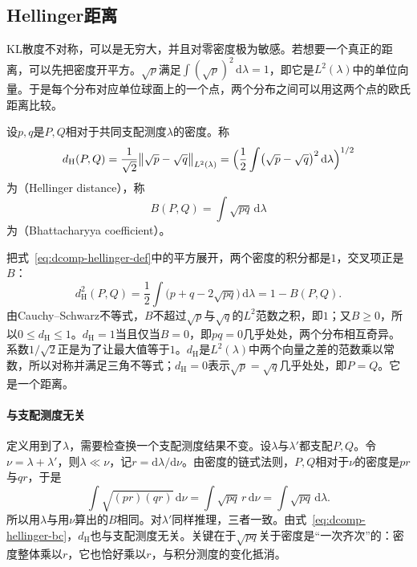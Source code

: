 \subsection{Hellinger距离}
\label{sec:dcomp-hellinger}

KL散度不对称，可以是无穷大，并且对零密度极为敏感。若想要一个真正的距离，可以先把密度开平方。$\sqrt{p}$满足$\int(\sqrt{p})^{2}\,\mathrm{d}\lambda=1$，即它是$L^{2}(\lambda)$中的单位向量。于是每个分布对应单位球面上的一个点，两个分布之间可以用这两个点的欧氏距离比较。

\begin{definition}[Hellinger距离与Bhattacharyya系数]
\label{def:dcomp-hellinger}
设$p,q$是$P,Q$相对于共同支配测度$\lambda$的密度。称
\begin{equation}
 d_{\mathrm{H}}(P,Q)=\frac{1}{\sqrt2}\bigl\lVert\sqrt{p}-\sqrt{q}\bigr\rVert_{L^{2}(\lambda)}=\Bigl(\frac12\int\bigl(\sqrt{p}-\sqrt{q}\bigr)^{2}\,\mathrm{d}\lambda\Bigr)^{1/2}
 \label{eq:dcomp-hellinger-def}
\end{equation}
为（Hellinger distance），称
\begin{equation}
 B(P,Q)=\int\sqrt{pq}\,\mathrm{d}\lambda
 \label{eq:dcomp-bhattacharyya-coefficient}
\end{equation}
为（Bhattacharyya coefficient）。
\end{definition}

把式~\eqref{eq:dcomp-hellinger-def}中的平方展开，两个密度的积分都是$1$，交叉项正是$B$：
\begin{equation}
 d_{\mathrm{H}}^{2}(P,Q)=\frac12\int\bigl(p+q-2\sqrt{pq}\bigr)\,\mathrm{d}\lambda=1-B(P,Q) .
 \label{eq:dcomp-hellinger-bc}
\end{equation}
由Cauchy--Schwarz不等式，$B$不超过$\sqrt{p}$与$\sqrt{q}$的$L^{2}$范数之积，即$1$；又$B\geq0$，所以$0\leq d_{\mathrm{H}}\leq1$。$d_{\mathrm{H}}=1$当且仅当$B=0$，即$pq=0$几乎处处，两个分布相互奇异。系数$1/\sqrt2$正是为了让最大值等于$1$。$d_{\mathrm{H}}$是$L^{2}(\lambda)$中两个向量之差的范数乘以常数，所以对称并满足三角不等式；$d_{\mathrm{H}}=0$表示$\sqrt{p}=\sqrt{q}$几乎处处，即$P=Q$。它是一个距离。

\paragraph{与支配测度无关}
定义用到了$\lambda$，需要检查换一个支配测度结果不变。设$\lambda$与$\lambda'$都支配$P,Q$。令$\nu=\lambda+\lambda'$，则$\lambda\ll\nu$，记$r=\mathrm{d}\lambda/\mathrm{d}\nu$。由密度的链式法则，$P,Q$相对于$\nu$的密度是$pr$与$qr$，于是
\[
 \int\sqrt{(pr)(qr)}\,\mathrm{d}\nu=\int\sqrt{pq}\,r\,\mathrm{d}\nu=\int\sqrt{pq}\,\mathrm{d}\lambda .
\]
所以用$\lambda$与用$\nu$算出的$B$相同。对$\lambda'$同样推理，三者一致。由式~\eqref{eq:dcomp-hellinger-bc}，$d_{\mathrm{H}}$也与支配测度无关。关键在于$\sqrt{pq}$关于密度是“一次齐次”的：密度整体乘以$r$，它也恰好乘以$r$，与积分测度的变化抵消。

